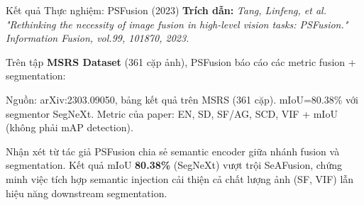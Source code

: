 \documentclass{beamer}
\begin{document}
\begin{frame}{Kết quả Thực nghiệm: PSFusion (2023)}
    \small
    \textbf{Trích dẫn:} \textit{Tang, Linfeng, et al. "Rethinking the necessity of image fusion in high-level vision tasks: PSFusion." Information Fusion, vol.99, 101870, 2023.}

    \vspace{0.1cm}
    Trên tập \textbf{MSRS Dataset} (361 cặp ảnh), PSFusion báo cáo các metric fusion + segmentation:
    
    \vspace{0.1cm}
    \begin{table}
        \centering
        \renewcommand{\arraystretch}{1.2}
    \end{table}
    {\tiny Nguồn: arXiv:2303.09050, bảng kết quả trên MSRS (361 cặp). mIoU=80.38\% với segmentor SegNeXt. Metric của paper: EN, SD, SF/AG, SCD, VIF + mIoU (không phải mAP detection).}

    \begin{block}{Nhận xét từ tác giả}
        PSFusion chia sẻ semantic encoder giữa nhánh fusion và segmentation. Kết quả mIoU \textbf{80.38\%} (SegNeXt) vượt trội SeAFusion, chứng minh việc tích hợp semantic injection cải thiện cả chất lượng ảnh (SF, VIF) lẫn hiệu năng downstream segmentation.
    \end{block}
\end{frame}
\end{document}
